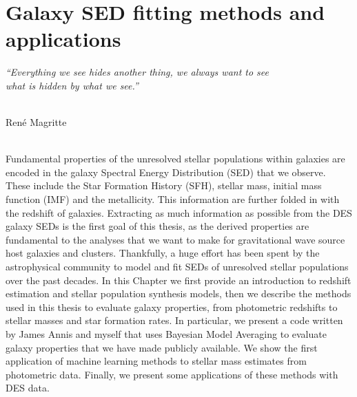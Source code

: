 \chapter{Galaxy SED fitting methods and applications}\label{chp:sed}

\begin{flushright}
  {\em ``Everything we see hides another thing, we always want to see\\ what is hidden by what we see.''}\\

\ \

\normalsize
{Ren\'e Magritte}  
\end{flushright}


\\


Fundamental properties of the unresolved stellar populations within galaxies are encoded in the galaxy Spectral Energy Distribution (SED) that we observe. These include the Star Formation History (SFH), stellar mass, initial mass function (IMF) and the metallicity. This information are further folded in with the redshift of galaxies. Extracting as much information as possible from the DES galaxy SEDs is the first goal of this thesis, as the derived properties are fundamental to the analyses that we want to make for gravitational wave source host galaxies and clusters. Thankfully, a huge effort has been spent by the astrophysical community to model and fit SEDs of unresolved stellar populations over the past decades.
In this Chapter we first provide an introduction to redshift estimation and stellar population synthesis models, then we describe the methods used in this thesis to evaluate galaxy properties, from photometric redshifts to stellar masses and star formation rates. In particular, we present a code written by James Annis and myself that uses Bayesian Model Averaging to evaluate galaxy properties that we have made publicly available. We show the first application of machine learning methods to stellar mass estimates from photometric data. Finally, we present some applications of these methods with DES data.

